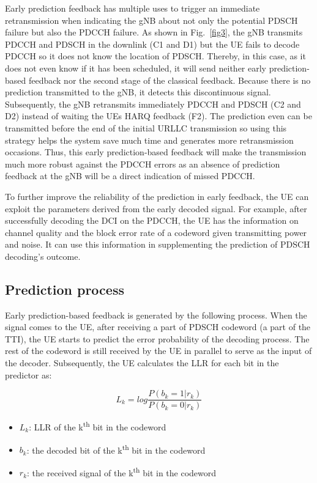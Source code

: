 \documentclass[conference]{IEEEtran}
\begin{document}
Early prediction feedback has multiple uses to trigger an immediate retransmission when indicating the gNB about not only the potential PDSCH failure but also the PDCCH failure. As shown in Fig.~\ref{fig3}, the gNB transmits PDCCH and PDSCH in the downlink (C1 and D1) but the UE fails to decode PDCCH so it does not know the location of PDSCH. Thereby, in this case, as it does not even know if it has been scheduled, it will send neither early prediction-based feedback nor the second stage of the classical feedback. Because there is no prediction transmitted to the gNB, it detects this discontinuous signal. Subsequently, the gNB retransmits immediately PDCCH and PDSCH (C2 and D2) instead of waiting the UE\textquotesingle s HARQ feedback (F2). The prediction even can be transmitted before the end of the initial URLLC transmission so using this strategy helps the system save much time and generates more retransmission occasions. Thus, this early prediction-based feedback will make the transmission much more robust against the PDCCH errors as an absence of prediction feedback at the gNB will be a direct indication of missed PDCCH. 

To further improve the reliability of the prediction in early
feedback, the UE can exploit the parameters derived from the
early decoded signal. For example, after successfully decoding
the DCI on the PDCCH, the UE has the information on
channel quality and the block error rate of a codeword given
transmitting power and noise. It can use this information in
supplementing the prediction of PDSCH decoding's outcome.

\subsection{Prediction process}\label{BB}
Early prediction-based feedback is generated by the following process. When the signal comes to the UE, after receiving a part of PDSCH codeword (a part of the TTI), the UE starts to predict the error probability of the decoding process. The rest of the codeword is still received by the UE in parallel to serve as the input of the decoder. Subsequently, the UE calculates the LLR for each bit in the predictor as: 

\begin{equation}
    L_{k} = log \frac{P(b_{k}=1|r_{k})}{P(b_{k}=0|r_{k})}
\end{equation}

\begin{itemize}
    \item $L_{k}$: LLR of the k\textsuperscript{th} bit in the codeword 
    \item $b_{k}$: the decoded bit of the k\textsuperscript{th} bit in the codeword
    \item $r_{k}$: the received signal of the k\textsuperscript{th} bit in the codeword
\end{itemize}
\end{document}
